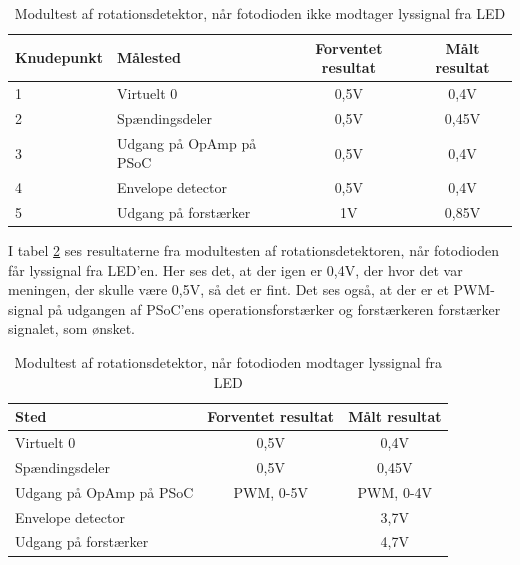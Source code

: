 \begin{table}[H]
	\centering
	\begin{tabular}{|l|l|c|c|}
		\hline
		\textbf{Knudepunkt}		& \textbf{Målested}       & \textbf{Forventet resultat} & \textbf{Målt resultat} \\ \hline
		1						& Virtuelt 0              & 0,5V                        & 0,4V                   \\ \hline
		2						& Spændingsdeler          & 0,5V                        & 0,45V                  \\ \hline
		3						& Udgang på OpAmp på PSoC & 0,5V                        & 0,4V                   \\ \hline
		4 						& Envelope detector       & 0,5V                        & 0,4V                   \\ \hline
		5 						& Udgang på forstærker    & 1V                          & 0,85V                  \\ \hline
	\end{tabular}
	\caption{Modultest af rotationsdetektor, når fotodioden ikke modtager lyssignal fra LED}
	\label{dioderIkkeSe}
\end{table}

I tabel \ref{dioderSe} ses resultaterne fra modultesten af rotationsdetektoren, når fotodioden får lyssignal fra LED'en. Her ses det, at der igen er 0,4V, der hvor det var meningen, der skulle være 0,5V, så det er fint. Det ses også, at der er et PWM-signal på udgangen af PSoC'ens operationsforstærker og forstærkeren forstærker signalet, som ønsket. 

\begin{table}[H]
	\centering
	\begin{tabular}{|l|c|c|}
		\hline
		\textbf{Sted}           & \textbf{Forventet resultat} & \textbf{Målt resultat} \\ \hline
		Virtuelt 0              & 0,5V                        & 0,4V                   \\ \hline
		Spændingsdeler          & 0,5V                        & 0,45V                  \\ \hline
		Udgang på OpAmp på PSoC & PWM, 0-5V                   & PWM, 0-4V              \\ \hline
		Envelope detector       & \multicolumn{1}{l|}{}       & 3,7V                   \\ \hline
		Udgang på forstærker    & \multicolumn{1}{l|}{}       & 4,7V                   \\ \hline
	\end{tabular}
	\caption{Modultest af rotationsdetektor, når fotodioden modtager lyssignal fra LED}
	\label{dioderSe}
\end{table}

